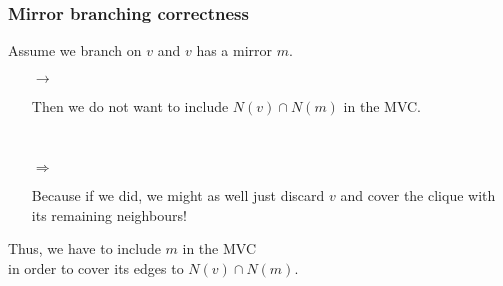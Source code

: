 \documentclass{beamer}[12pt]
\begin{document}
	\begin{frame}
	\frametitle{Mirror branching correctness}
	
	\hfil
	
	\begin{center}
	Assume we branch on $ v $ and $ v $ has a mirror $ m $.\\
	\pause
	\vspace*{4mm}

	\begin{itemize}
		
		\item[$\rightarrow$]
		\begin{minipage}[t]{25em}
			Then we do not want to include $ N(v) \cap N(m) $ in the MVC.\\
		\end{minipage}\\
		\pause

		\item[$\Rightarrow$]
		\begin{minipage}[t]{25em}
			Because if we did, we might as well just discard $ v $ and cover the clique with its remaining neighbours!
		\end{minipage}
	
	\end{itemize}
	\pause
	\vspace*{5mm}
	\begin{minipage}[t]{20em}
		
		\begin{center}
			Thus, we have to include $ m $ in the MVC \\in order to cover its edges to $ N(v) \cap N(m) $.
		\end{center}

	\end{minipage}

	\end{center}
	
	\end{frame}
\end{document}
